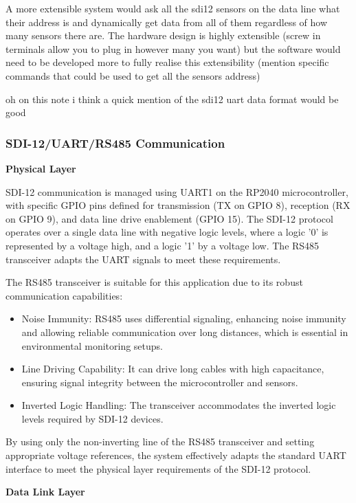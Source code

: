 A more extensible system would ask all the sdi12 sensors on the data line what their address is 
and dynamically get data from all of them regardless of how many sensors there are. The hardware 
design is highly extensible (screw in terminals allow you to plug in however many you want) but 
the software would need to be developed more to fully realise this extensibility (mention specific 
commands that could be used to get all the sensors address)

oh on this note i think a quick mention of the sdi12 uart data format would be good

\subsubsection{SDI-12/UART/RS485 Communication}

\textbf{Physical Layer}

SDI-12 communication is managed using UART1 on the RP2040 microcontroller, with specific 
GPIO pins defined for transmission (TX on GPIO 8), reception (RX on GPIO 9), and data 
line drive enablement (GPIO 15). The SDI-12 protocol operates over a single data line 
with negative logic levels, where a logic '0' is represented by a voltage high, and a 
logic '1' by a voltage low. The RS485 transceiver adapts the UART signals to meet these requirements.

The RS485 transceiver is suitable for this application due to its robust communication capabilities:

\begin{itemize}
    \item Noise Immunity: RS485 uses differential signaling, enhancing noise immunity and allowing 
    reliable communication over long distances, which is essential in environmental monitoring setups.
    \item Line Driving Capability: It can drive long cables with high capacitance, ensuring signal 
    integrity between the microcontroller and sensors.
    \item Inverted Logic Handling: The transceiver accommodates the inverted logic levels required by SDI-12 devices.
\end{itemize}

By using only the non-inverting line of the RS485 transceiver and setting appropriate voltage references, 
the system effectively adapts the standard UART interface to meet the physical layer requirements of the SDI-12 protocol.

\textbf{Data Link Layer}

